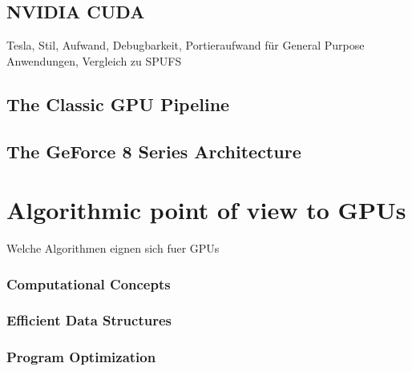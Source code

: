 \subsection{NVIDIA CUDA} %
\label{sub:nvidia_cuda}
Tesla, Stil, Aufwand, Debugbarkeit, Portieraufwand für 
General Purpose Anwendungen, Vergleich zu SPUFS

\subsection{The Classic GPU Pipeline} %
\label{sub:the_classic_gpu_pipeline}

\subsection{The GeForce 8 Series Architecture} %
\label{sub:the_geforce_8_series_architecture}


\section{Algorithmic point of view to GPUs} %
\label{sec:algorithmic_view_to_gpus}
Welche Algorithmen eignen sich fuer GPUs
\subsubsection{Computational Concepts} %
\label{ssub:computational_concepts}

\subsubsection{Efficient Data Structures} %
\label{ssub:efficient_data_structures}

\subsubsection{Program Optimization} %
\label{ssub:program_optimization}


